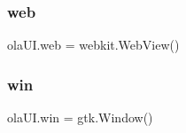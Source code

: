 \subsubsection{\texorpdfstring{web}{web}}
{\footnotesize\ttfamily ola\+U\+I.\+web = webkit.\+Web\+View()}

\mbox{\label{namespaceolaUI_a99a88a88414bc1bab55b329bd312ad76}} 
\subsubsection{\texorpdfstring{win}{win}}
{\footnotesize\ttfamily ola\+U\+I.\+win = gtk.\+Window()}

